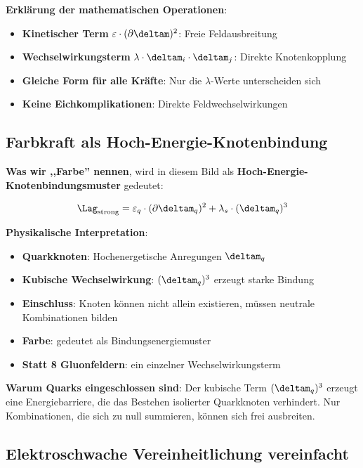	\textbf{Erklärung der mathematischen Operationen}:
	\begin{itemize}
		\item \textbf{Kinetischer Term} $\varepsilon \cdot (\partial \deltam)^2$: Freie Feldausbreitung
		\item \textbf{Wechselwirkungsterm} $\lambda \cdot \deltam_i \cdot \deltam_j$: Direkte Knotenkopplung
		\item \textbf{Gleiche Form für alle Kräfte}: Nur die $\lambda$-Werte unterscheiden sich
		\item \textbf{Keine Eichkomplikationen}: Direkte Feldwechselwirkungen
	\end{itemize}
	
	\subsection{Farbkraft als Hoch-Energie-Knotenbindung}
	
	\textbf{Was wir ,,Farbe'' nennen}, wird in diesem Bild als \textbf{Hoch-Energie-Knotenbindungsmuster} gedeutet:
	
	\begin{equation}
		\Lag_{\text{strong}} = \varepsilon_q \cdot (\partial \deltam_q)^2 + \lambda_s \cdot (\deltam_q)^3
	\end{equation}
	
	\textbf{Physikalische Interpretation}:
	\begin{itemize}
		\item \textbf{Quarkknoten}: Hochenergetische Anregungen $\deltam_q$ 
		\item \textbf{Kubische Wechselwirkung}: $(\deltam_q)^3$ erzeugt starke Bindung
		\item \textbf{Einschluss}: Knoten können nicht allein existieren, müssen neutrale Kombinationen bilden
		\item \textbf{Farbe}: gedeutet als Bindungsenergiemuster
		\item \textbf{Statt 8 Gluonfeldern}: ein einzelner Wechselwirkungsterm
	\end{itemize}
	
	\textbf{Warum Quarks eingeschlossen sind}:
	Der kubische Term $(\deltam_q)^3$ erzeugt eine Energiebarriere, die das Bestehen isolierter Quarkknoten verhindert. Nur Kombinationen, die sich zu null summieren, können sich frei ausbreiten.
	
	\subsection{Elektroschwache Vereinheitlichung vereinfacht}
	
